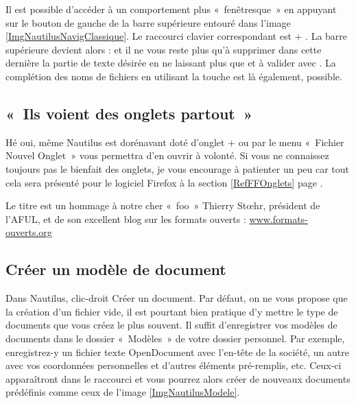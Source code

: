 \begin{nota}
Il est possible d'accéder à un comportement plus «~fenêtresque~» en appuyant sur le bouton de gauche de la barre supérieure entouré dans l'image \ref{ImgNautilusNavigClassique}. Le raccourci clavier correspondant est  + . La barre supérieure devient alors :  et il ne vous reste plus qu'à supprimer dans cette dernière la partie de texte désirée en ne laissant plus que  et à valider avec . La complétion des noms de fichiers en utilisant la touche  est là également, possible. 
\end{nota}
\subsection{«~Ils voient des onglets partout~»}
Hé oui, même Nautilus est dorénavant doté d'onglet  +  ou par le menu «~Fichier \FlecheDroite Nouvel Onglet~» vous permettra d'en ouvrir à volonté. Si vous ne connaissez toujours pas le bienfait des onglets, je vous encourage à patienter un peu car tout cela sera présenté pour le logiciel Firefox à la section \ref{RefFFOnglets} page \pageref{RefFFOnglets}.
\begin{nota}
Le titre est un hommage à notre cher «~foo~» Thierry Stœhr, président de l'AFUL, et de son excellent blog sur les formats ouverts : \url{www.formats-ouverts.org}
\end{nota}
\subsection{Créer un modèle de document}
Dans Nautilus, clic-droit \FlecheDroite Créer un document. Par défaut, on ne vous propose que la création d'un fichier vide, il est pourtant bien pratique d'y mettre le type de documents que vous créez le plus souvent. Il suffit d'enregistrer vos modèles de documents dans le dossier «~Modèles~» de votre dossier personnel. Par exemple, enregistrez-y un fichier texte OpenDocument avec l'en-tête de la société, un autre avec vos coordonnées personnelles et d'autres éléments pré-remplis, etc.  Ceux-ci apparaîtront dans le raccourci et vous pourrez alors créer de nouveaux documents prédéfinis comme ceux de l'image \ref{ImgNautilusModele}.
